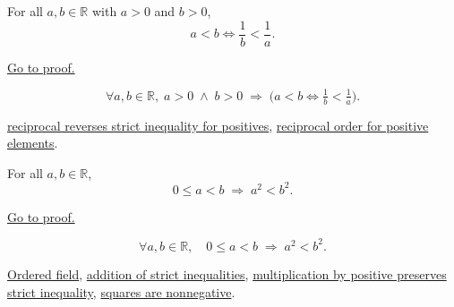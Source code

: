 
\begin{theorem}
\label{thm:ineq-reciprocal-flip}
For all $a, b \in \mathbb{R}$ with $a > 0$ and $b > 0$,
\[
  a < b \iff \frac{1}{b} < \frac{1}{a}.
\]
\end{theorem}



\begin{remark*}[Proof]
\hyperref[prf:ineq-reciprocal-flip]{Go to proof.}
\end{remark*}

\begin{remark*}
\[
  \forall a, b \in \mathbb{R},\;
  a > 0 \;\land\; b > 0 \;\Rightarrow\;
  \bigl(a < b \iff \tfrac{1}{b} < \tfrac{1}{a}\bigr).
\]
\end{remark*}

\begin{dependencies}
\hyperref[thm:ineq-reciprocal-positive]{reciprocal reverses strict inequality for positives},
\hyperref[thm:reciprocal-reverses-order-on-positives-q]{reciprocal order for positive elements}.
\end{dependencies}


\begin{theorem}
\label{thm:ineq-square-monotone}
For all $a, b \in \mathbb{R}$,
\[
  0 \le a < b \;\Rightarrow\; a^2 < b^2.
\]
\end{theorem}



\begin{remark*}[Proof]
\hyperref[prf:ineq-square-monotone]{Go to proof.}
\end{remark*}

\begin{remark*}
\[
  \forall a, b \in \mathbb{R},\quad
  0 \le a < b \;\Rightarrow\; a^2 < b^2.
\]
\end{remark*}

\begin{dependencies}
\hyperref[def:real-ordered-field]{Ordered field},
\hyperref[thm:ineq-add-inequalities]{addition of strict inequalities},
\hyperref[thm:ineq-multiply-positive]{multiplication by positive preserves strict inequality},
\hyperref[thm:ordered-field-squares-nonnegative]{squares are nonnegative}.
\end{dependencies}

